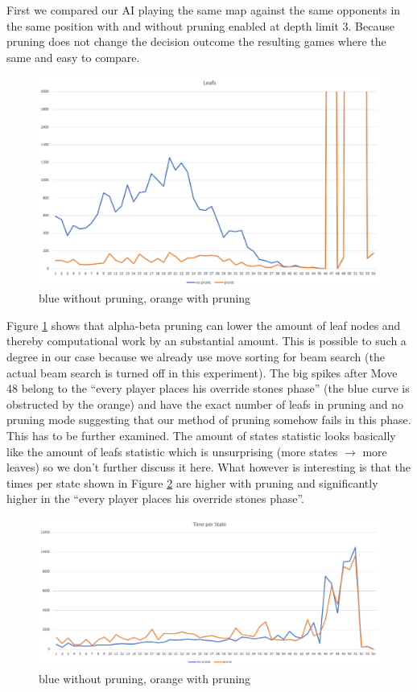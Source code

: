 \documentclass[a4paper,12pt]{article}
\begin{document}
    First we compared our AI playing the same map against the same opponents in the same position with and without pruning enabled at depth limit 3. Because pruning does not change the decision outcome the resulting games where the same and easy to compare. 
    \begin{figure}[h!]
        \centering
        \includegraphics[width = 14cm]{leafs.png}
        \caption{blue without pruning, orange with pruning}
        \label{fig:leafs}
    \end{figure}
    Figure \ref{fig:leafs} shows that alpha-beta pruning can lower the amount of leaf nodes and thereby computational work by an substantial amount. This is possible to such a degree in our case because we already use move sorting for beam search (the actual beam search is turned off in this experiment). The big spikes after Move 48 belong to the ``every player places his override stones phase'' (the blue curve is obstructed by the orange) and have the exact number of leafs in pruning and no pruning mode suggesting that our method of pruning somehow fails in this phase. This has to be further examined. The amount of states statistic looks basically like the amount of leafs statistic which is unsurprising (more states $\to$ more leaves) so we don't further discuss it here. What however is interesting is that the times per state shown in Figure \ref{fig:tps} are higher with pruning and significantly higher in the ``every player places his override stones phase''.
    \begin{figure}[h!]
        \centering
        \includegraphics[width = 14cm]{tps.png}
        \caption{blue without pruning, orange with pruning}
        \label{fig:tps}
    \end{figure}
\end{document}
